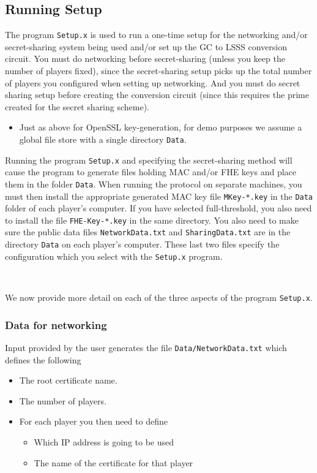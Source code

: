 \subsection{Running Setup}\label{subsec:setup}
The program \verb+Setup.x+ is used to run a one-time setup
for the networking and/or secret-sharing system being used
and/or set up the GC to LSSS conversion circuit.
You must do networking before secret-sharing (unless you keep
the number of players fixed), since the secret-sharing setup
picks up the total number of players you configured when setting
up networking.
And you must do secret sharing setup before creating the conversion
circuit (since this requires the prime created for the secret
sharing scheme).
\begin{itemize}
\item Just as above for OpenSSL key-generation, for demo purposes we assume
a global file store with a single directory \verb+Data+.
\end{itemize}
Running the program \verb+Setup.x+ and specifying the secret-sharing
method will cause the program to generate files holding MAC and/or FHE
keys and place them in the folder \verb+Data+.  When running the
protocol on separate machines, you must then install the appropriate
generated MAC key file \verb+MKey-*.key+ in the \verb+Data+ folder of
each player's computer.  If you have selected full-threshold, you also
need to install the file \verb+FHE-Key-*.key+ in the same directory.
You also need to make sure the public data files
\verb+NetworkData.txt+ and \verb+SharingData.txt+ are in the directory
\verb+Data+ on each player's computer.
These last two files specify the configuration which you select with
the \verb+Setup.x+ program.

~~

\noindent We now provide more detail on each of the three aspects of the program
\verb+Setup.x+.

\subsubsection{Data for networking}
Input provided by the user generates the file
\verb+Data/NetworkData.txt+ which defines the following
\begin{itemize}
\item The root certificate name.
\item The number of players.
\item For each player you then need to define
\begin{itemize}
  \item Which IP address is going to be used
  \item The name of the certificate for that player
\end{itemize}
\iffalse XXXX
\item Whether a fake offline phase is going to be used.
\item Whether a fake sacrifice phase is going to be used.
\fi
\end{itemize}

